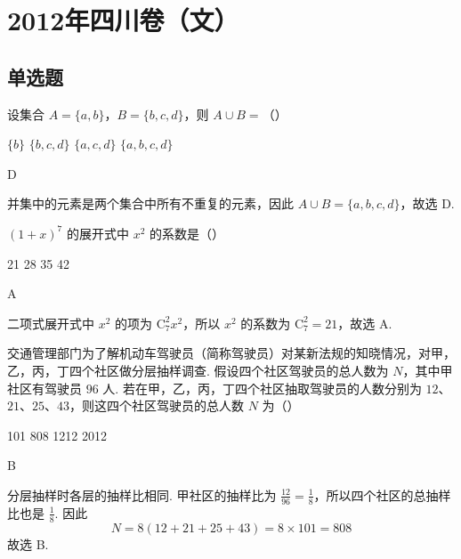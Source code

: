 \chapter{2012年四川卷（文）}

\section{单选题}

\begin{problem}
设集合 \(A = \{a, b\}\)，\(B = \{b, c, d\}\)，则 \(A \cup B =\)（\quad）

\choices
    {\(\{b\}\)}
    {\(\{b, c, d\}\)}
    {\(\{a, c, d\}\)}
    {\(\{a, b, c, d\}\)}
\end{problem}

\begin{answer}
D
\end{answer}

\begin{solution}
并集中的元素是两个集合中所有不重复的元素，因此 \(A\cup B=\{a,b,c,d\}\)，故选 D.
\end{solution}

\begin{problem}
\((1 + x)^{7}\) 的展开式中 \(x^{2}\) 的系数是（\quad）

\choices
    {21}
    {28}
    {35}
    {42}
\end{problem}

\begin{answer}
A
\end{answer}

\begin{solution}
二项式展开式中 \(x^2\) 的项为 \(\mathrm C_7^2x^2\)，所以 \(x^2\) 的系数为 \(\mathrm C_7^2=21\)，故选 A.
\end{solution}

\begin{problem}
交通管理部门为了解机动车驾驶员（简称驾驶员）对某新法规的知晓情况，对甲，乙，丙，丁四个社区做分层抽样调查. 假设四个社区驾驶员的总人数为 \(N\)，其中甲社区有驾驶员 \(96\) 人. 若在甲，乙，丙，丁四个社区抽取驾驶员的人数分别为 \(12\)、\(21\)、\(25\)、\(43\)，则这四个社区驾驶员的总人数 \(N\) 为（\quad）

\choices
    {101}
    {808}
    {1212}
    {2012}
\end{problem}

\begin{answer}
B
\end{answer}

\begin{solution}
分层抽样时各层的抽样比相同. 甲社区的抽样比为 \(\frac{12}{96}=\frac{1}{8}\)，所以四个社区的总抽样比也是 \(\frac{1}{8}\). 因此
\[
N=8(12+21+25+43)=8\times101=808
\]
故选 B.
\end{solution}

